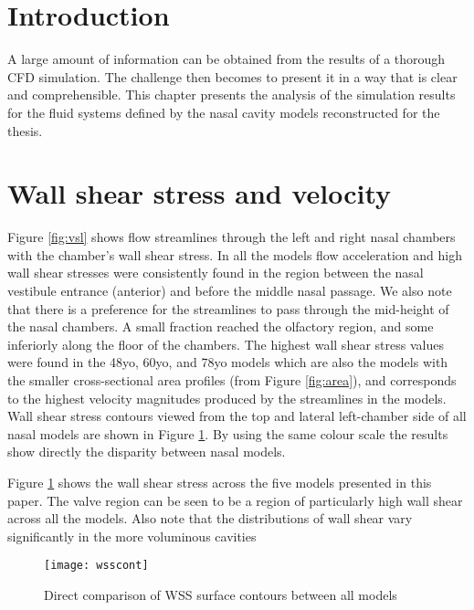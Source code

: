 \section{Introduction}
A large amount of information can be obtained from the results of a thorough CFD simulation. The challenge then becomes to present it in a way that is clear and comprehensible.
This chapter presents the analysis of the simulation results for the fluid systems defined by the nasal cavity models reconstructed for the thesis.


\section{Wall shear stress and velocity}
Figure \ref{fig:vsl} shows flow streamlines through the left and right nasal chambers with the chamber’s wall shear stress. In all the models flow acceleration and high wall shear stresses were consistently found in the region between the nasal vestibule entrance (anterior) and before the middle nasal passage. We also note that there is a preference for the streamlines to pass through the mid-height of the nasal chambers. A small fraction reached the olfactory region, and some inferiorly along the floor of the chambers. The highest wall shear stress values were found in the 48yo, 60yo, and 78yo models which are also the models with the smaller cross-sectional area profiles (from Figure \ref{fig:area}), and corresponds to the highest velocity magnitudes produced by the streamlines in the models. Wall shear stress contours viewed from the top and lateral left-chamber side of all nasal models are shown in Figure \ref{fig:wcont}. By using the same colour scale the results show directly the disparity between nasal models.

Figure \ref{fig:wcont} shows the wall shear stress across the five models presented in this paper. The valve region can be seen to be a region of particularly high wall shear across all the models. Also note that the distributions of wall shear vary significantly in the more voluminous cavities

\begin{figure} 
  \texttt{[image: wsscont]}
  \caption{Direct comparison of WSS surface contours between all models}
    \label{fig:wcont}
\end{figure}


